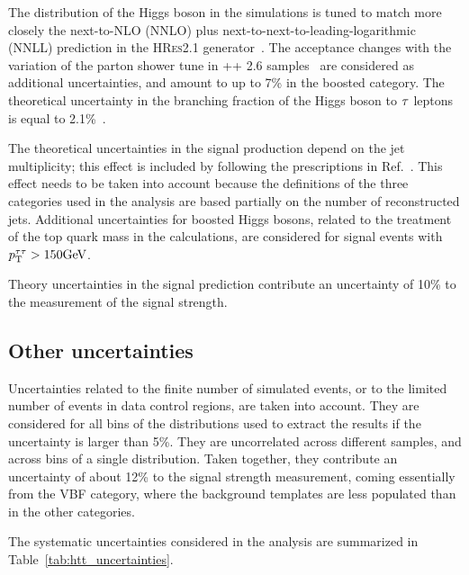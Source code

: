 The \pt distribution of the Higgs boson in the {} simulations is tuned to match more closely
the next-to-NLO (NNLO) plus
next-to-next-to-leading-logarithmic (NNLL) prediction in the
\textsc{HRes2.1} generator~\cite{deFlorian:2012mx,Grazzini:2013mca}.
The acceptance changes with the variation of the parton shower tune in \HERWIG++ 2.6 samples~\cite{Bellm:2013hwb} 
are considered as additional uncertainties, and amount to up to 7\% in the boosted category. The theoretical 
uncertainty in the branching fraction of the Higgs boson to $\tau$ leptons is equal to 2.1\%~\cite{deFlorian:2016spz}.

The theoretical uncertainties in the signal production depend on the jet multiplicity; this effect is included 
by following the prescriptions in Ref.~\cite{Stewart:2011cf}. This effect needs to be taken into account because 
the definitions of the three categories used in the analysis are based partially on the number of reconstructed 
jets. Additional uncertainties for boosted Higgs bosons, related to the treatment of the top quark mass in 
the calculations, are considered for signal events with $p_\mathrm{T}^{\tau\tau}>150\mathrm{GeV}$.

Theory uncertainties in the signal prediction contribute an uncertainty of 10\% to the measurement of the signal strength.


\subsection{Other uncertainties}
Uncertainties related to the finite number of simulated events, or to the limited number of events in data control 
regions, are taken into account. They are considered for all bins of the distributions used to extract the results 
if the uncertainty is larger than 5\%. They are uncorrelated across different samples, and across bins of a single 
distribution. Taken together, they contribute an uncertainty of about 12\% to the signal strength measurement, 
coming essentially from the VBF category, where the background templates are less
populated than in the other categories.

The systematic uncertainties considered in the analysis are summarized in Table~\ref{tab:htt_uncertainties}.

